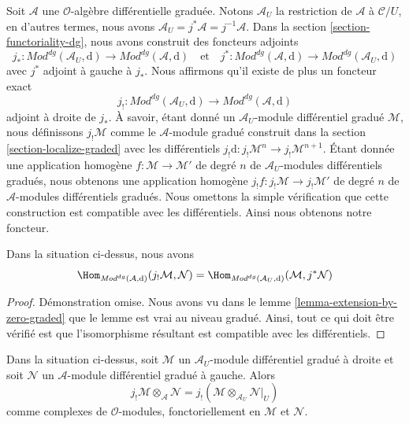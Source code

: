 \medskip\noindent
Soit $\mathcal{A}$ une $\mathcal{O}$-algèbre différentielle graduée.
Notons $\mathcal{A}_U$ la restriction de $\mathcal{A}$ à $\mathcal{C}/U$, en d'autres termes, nous avons $\mathcal{A}_U = j^*\mathcal{A} = j^{-1}\mathcal{A}$.
Dans la section \ref{section-functoriality-dg}, nous avons construit des foncteurs adjoints
$$
j_* :
\textit{Mod}^{dg}(\mathcal{A}_U, \text{d})
\longrightarrow
\textit{Mod}^{dg}(\mathcal{A}, \text{d})
\quad\text{et}\quad
j^* :
\textit{Mod}^{dg}(\mathcal{A}, \text{d})
\longrightarrow
\textit{Mod}^{dg}(\mathcal{A}_U, \text{d})
$$
avec $j^*$ adjoint à gauche à $j_*$.
Nous affirmons qu'il existe de plus un foncteur exact
$$
j_! :
\textit{Mod}^{dg}(\mathcal{A}_U, \text{d})
\longrightarrow
\textit{Mod}^{dg}(\mathcal{A}, \text{d})
$$
adjoint à droite de $j_*$.
À savoir, étant donné un $\mathcal{A}_U$-module différentiel gradué $\mathcal{M}$, nous définissons $j_!\mathcal{M}$ comme le $\mathcal{A}$-module gradué construit dans la section \ref{section-localize-graded}  avec les différentiels $j_!\text{d} : j_!\mathcal{M}^n \to j_!\mathcal{M}^{n + 1}$.
Étant donnée une application homogène $f : \mathcal{M} \to \mathcal{M}'$ de degré $n$ de $\mathcal{A}_U$-modules différentiels gradués, nous obtenons une application homogène $j_!f : j_!\mathcal{M} \to j_!\mathcal{M}'$ de degré $n$ de $\mathcal{A}$-modules différentiels gradués.
Nous omettons la simple vérification que cette construction est compatible avec les différentiels.
Ainsi nous obtenons notre foncteur.

\begin{lemma}
\label{lemma-extension-by-zero-dg}
Dans la situation ci-dessus, nous avons
$$
\Hom_{\textit{Mod}^{dg}(\mathcal{A}, \text{d})}(
j_!\mathcal{M}, \mathcal{N}) =
\Hom_{\textit{Mod}^{dg}(\mathcal{A}_U, \text{d})}(
\mathcal{M}, j^*\mathcal{N})
$$
\end{lemma}

\begin{proof}
Démonstration omise.
Nous avons vu dans le lemme \ref{lemma-extension-by-zero-graded}  que le lemme est vrai au niveau gradué.
Ainsi, tout ce qui doit être vérifié est que l'isomorphisme résultant est compatible avec les différentiels.
\end{proof}

\begin{lemma}
\label{lemma-tensor-with-extension-by-zero-dg}
Dans la situation ci-dessus, soit $\mathcal{M}$ un $\mathcal{A}_U$-module différentiel gradué à droite et soit $\mathcal{N}$ un $\mathcal{A}$-module différentiel gradué à gauche. Alors
$$
j_!\mathcal{M} \otimes_\mathcal{A} \mathcal{N} =
j_!(\mathcal{M} \otimes_{\mathcal{A}_U} \mathcal{N}|_U)
$$
comme complexes de $\mathcal{O}$-modules, fonctoriellement en $\mathcal{M}$ et $\mathcal{N}$.
\end{lemma}

